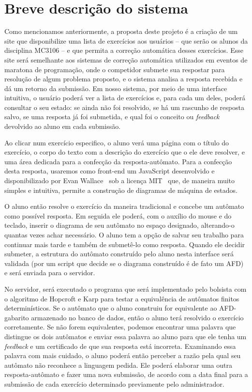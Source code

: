 \documentclass[
	12pt,				%
	openany,
	oneside,
	a4paper,			%
	english,			%
	brazil,				%
	]{abntex2}
\begin{document}
\section {Breve descrição do sistema}

Como mencionamos anteriormente, a proposta deste projeto é a criação de um site que disponibilize uma lista de exercícios aos usuários -- que serão os alunos da disciplina MC3106 -- e que permita a correção automática desses exercícios. Esse site será semelhante aos sistemas de correção automática utilizados em eventos de maratona de programação, onde o competidor submete sua respostar para resolução de algum problema proposto, e o sistema analisa a resposta recebida e dá um retorno da submissão. Em nosso sistema, por meio de uma interface intuitiva, o usuário poderá ver a lista de exercícios e, para cada um deles, poderá consultar o seu estado: se ainda não foi resolvido, se há um rascunho de resposta salvo, se uma resposta já foi submetida, e qual foi o conceito ou \emph{feedback} devolvido ao aluno em cada submissão.

Ao clicar num exercício especifico, o aluno verá uma página com o título do exercício, o corpo do texto com a descrição do exercício que o ele deve resolver, e uma área dedicada para a confecção da resposta-autômato. Para a confecção desta resposta, usaremos como front-end um JavaScript desenvolvido e disponibilizado por Evan Wallace~\cite{evan} sob a licença MIT~\cite{mit} que, de maneira muito simples e intuitiva, permite a construção de diagramas de máquina de estados.

O aluno então resolve o exercício da maneira tradicional e concebe um autômato como possível resposta. Em seguida ele poderá, com o auxílio do mouse e do teclado, inserir o diagrama de seu autômato no espaço designado, alterando-o quantas vezes achar necessário. O aluno tem a opção de salvar seu trabalho para continuar mais tarde e também de submetê-lo como resposta. Quando ele decidir submeter, a estrutura do autômato construído pelo aluno nesta interface será validada (por um script que decide se o diagrama construído é de fato um AFD) e será enviada para o servidor.

No servidor, será executado o programa que será implementado pelo bolsista com o algoritmo de Hopcroft e Karp para testar a equivalência de autômatos finitos determinísticos. Se o autômato que o aluno construiu for equivalente ao AFD-gabarito armazenado no banco de dados, então o aluno terá resolvido o exercício corretamente. Se não forem equivalentes, podemos encontrar uma palavra que distingue os dois autômatos e enviar essa palavra ao aluno para que ele tenha um \emph{feedback} e um certificado de que sua resposta está incorreta. Examinando essa palavra com mais cuidado, o aluno poderá então perceber a razão pela qual seu autômato não reconhece a linguagem pedida. Ele poderá elaborar uma outra resposta-autômato e fazer uma nova submissão, de acordo com a data final para a submissão de cada exercício determinado previamente pelo administrador.
\end{document}
